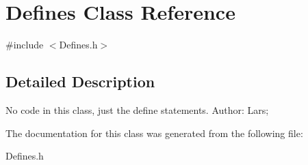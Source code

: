 \hypertarget{classDefines}{
\section{Defines Class Reference}
\label{classDefines}
}


{\ttfamily \#include $<$Defines.h$>$}

\subsection{Detailed Description}
No code in this class, just the define statements. Author: Lars; 

The documentation for this class was generated from the following file:\begin{DoxyCompactItemize}
\item 
Defines.h\end{DoxyCompactItemize}
